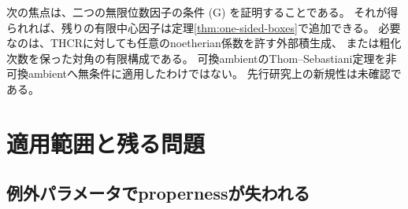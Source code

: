 次の焦点は、二つの無限位数因子の条件 (G) を証明することである。
それが得られれば、残りの有限中心因子は定理\ref{thm:one-sided-boxes}で追加できる。
必要なのは、THCRに対しても任意のnoetherian係数を許す外部積生成、
または粗化次数を保った対角の有限構成である。
可換ambientのThom--Sebastiani定理を非可換ambientへ無条件に適用したわけではない。
先行研究上の新規性は未確認である。

\section{適用範囲と残る問題}\label{sec:scope}

\subsection{例外パラメータでpropernessが失われる}

